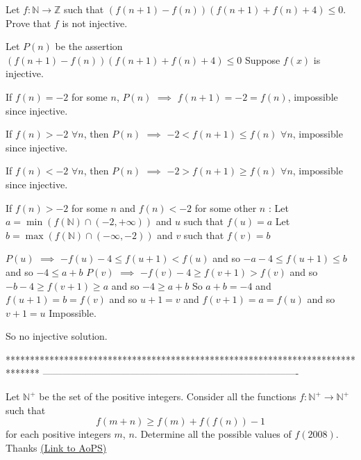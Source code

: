 \begin{solution}
	\begin{tcolorbox}Let $f: \mathbb{N}\to \mathbb{Z}$ such that $(f(n+1)-f(n))(f(n+1)+f(n)+4) \le 0$. Prove that $f$ is not injective.\end{tcolorbox}
Let $P(n)$ be the assertion $(f(n+1)-f(n))(f(n+1)+f(n)+4)\le 0$
Suppose $f(x)$ is injective.

If $f(n)=-2$ for some $n$, $P(n)$ $\implies$ $f(n+1)=-2=f(n)$, impossible since injective.

If $f(n)>-2$ $\forall n$, then $P(n)$ $\implies$ $-2< f(n+1)\le f(n)$ $\forall n$, impossible since injective.

If $f(n)<-2$ $\forall n$, then $P(n)$ $\implies$ $-2> f(n+1)\ge f(n)$ $\forall n$, impossible since injective.

If $f(n)>-2$ for some $n$ and $f(n)<-2$ for some other $n$ :
Let $a=\min(f(\mathbb N)\cap(-2,+\infty))$ and $u$ such that $f(u)=a$
Let $b=\max(f(\mathbb N)\cap(-\infty,-2))$ and $v$ such that $f(v)=b$

$P(u)$ $\implies$ $-f(u)-4\le f(u+1)<f(u)$ and so $-a-4\le f(u+1)\le b$ and so $-4\le a+b$ 
$P(v)$ $\implies$ $-f(v)-4\ge f(v+1)>f(v)$ and so $-b-4\ge f(v+1)\ge a$ and so $-4\ge a+b$
So $a+b=-4$ and $f(u+1)=b=f(v)$ and so $u+1=v$ and $f(v+1)=a=f(u)$ and so $v+1=u$
Impossible.

So no injective solution.
\end{solution}
*******************************************************************************
-------------------------------------------------------------------------------

\begin{problem}
	Let $ \mathbb{N}^{+}$ be the set of the positive integers. Consider all the functions $f: \mathbb{N}^{+} \rightarrow \mathbb{N}^{+}$ such that 
\[f(m+n) \geq f(m) +f(f(n)) -1\]
for each positive integers $m$, $n$.
Determine all the possible values of $f(2008)$.
Thanks
	\flushright \href{https://artofproblemsolving.com/community/c6h568881}{(Link to AoPS)}
\end{problem}



